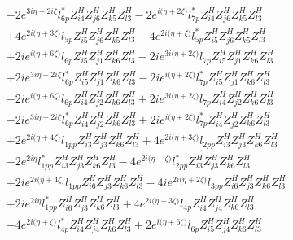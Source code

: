 \begin{align}
 &-2 e^{3 i \eta +2 i \zeta } l_{6p}^* Z_{{i 4}}^{H} Z_{{j 6}}^{H} Z_{{k 5}}^{H} Z_{{l 3}}^{H} -2 e^{i \Big(\eta +2 \zeta \Big)} l_{7p}^* Z_{{i 4}}^{H} Z_{{j 6}}^{H} Z_{{k 5}}^{H} Z_{{l 3}}^{H} \nonumber \\ 
 &+4 e^{2 i \Big(\eta +3 \zeta \Big)} l_{5p} Z_{{i 5}}^{H} Z_{{j 6}}^{H} Z_{{k 5}}^{H} Z_{{l 3}}^{H} -4 e^{2 i \Big(\eta +\zeta \Big)} l_{5p}^* Z_{{i 5}}^{H} Z_{{j 6}}^{H} Z_{{k 5}}^{H} Z_{{l 3}}^{H} \nonumber \\ 
 &+2 i e^{i \Big(\eta +6 \zeta \Big)} l_{6p} Z_{{i 5}}^{H} Z_{{j 1}}^{H} Z_{{k 6}}^{H} Z_{{l 3}}^{H} -2 i e^{3 i \Big(\eta +2 \zeta \Big)} l_{7p} Z_{{i 5}}^{H} Z_{{j 1}}^{H} Z_{{k 6}}^{H} Z_{{l 3}}^{H} \nonumber \\ 
 &+2 i e^{3 i \eta +2 i \zeta } l_{6p}^* Z_{{i 5}}^{H} Z_{{j 1}}^{H} Z_{{k 6}}^{H} Z_{{l 3}}^{H} -2 i e^{i \Big(\eta +2 \zeta \Big)} l_{7p}^* Z_{{i 5}}^{H} Z_{{j 1}}^{H} Z_{{k 6}}^{H} Z_{{l 3}}^{H} \nonumber \\ 
 &-2 i e^{i \Big(\eta +6 \zeta \Big)} l_{6p} Z_{{i 4}}^{H} Z_{{j 2}}^{H} Z_{{k 6}}^{H} Z_{{l 3}}^{H} +2 i e^{3 i \Big(\eta +2 \zeta \Big)} l_{7p} Z_{{i 4}}^{H} Z_{{j 2}}^{H} Z_{{k 6}}^{H} Z_{{l 3}}^{H} \nonumber \\ 
 &-2 i e^{3 i \eta +2 i \zeta } l_{6p}^* Z_{{i 4}}^{H} Z_{{j 2}}^{H} Z_{{k 6}}^{H} Z_{{l 3}}^{H} +2 i e^{i \Big(\eta +2 \zeta \Big)} l_{7p}^* Z_{{i 4}}^{H} Z_{{j 2}}^{H} Z_{{k 6}}^{H} Z_{{l 3}}^{H} \nonumber \\ 
 &+2 e^{2 i \Big(\eta +4 \zeta \Big)} l_{1pp} Z_{{i 3}}^{H} Z_{{j 3}}^{H} Z_{{k 6}}^{H} Z_{{l 3}}^{H} +4 e^{2 i \Big(\eta +3 \zeta \Big)} l_{2pp} Z_{{i 3}}^{H} Z_{{j 3}}^{H} Z_{{k 6}}^{H} Z_{{l 3}}^{H} \nonumber \\ 
 &-2 e^{2 i \eta } l_{1pp}^* Z_{{i 3}}^{H} Z_{{j 3}}^{H} Z_{{k 6}}^{H} Z_{{l 3}}^{H} -4 e^{2 i \Big(\eta +\zeta \Big)} l_{2pp}^* Z_{{i 3}}^{H} Z_{{j 3}}^{H} Z_{{k 6}}^{H} Z_{{l 3}}^{H} \nonumber \\ 
 &+2 i e^{2 i \Big(\eta +4 \zeta \Big)} l_{1pp} Z_{{i 6}}^{H} Z_{{j 3}}^{H} Z_{{k 6}}^{H} Z_{{l 3}}^{H} -4 i e^{2 i \Big(\eta +2 \zeta \Big)} l_{3pp} Z_{{i 6}}^{H} Z_{{j 3}}^{H} Z_{{k 6}}^{H} Z_{{l 3}}^{H} \nonumber \\ 
 &+2 i e^{2 i \eta } l_{1pp}^* Z_{{i 6}}^{H} Z_{{j 3}}^{H} Z_{{k 6}}^{H} Z_{{l 3}}^{H} +4 e^{2 i \Big(\eta +3 \zeta \Big)} l_{4p} Z_{{i 4}}^{H} Z_{{j 4}}^{H} Z_{{k 6}}^{H} Z_{{l 3}}^{H} \nonumber \\ 
 &-4 e^{2 i \Big(\eta +\zeta \Big)} l_{4p}^* Z_{{i 4}}^{H} Z_{{j 4}}^{H} Z_{{k 6}}^{H} Z_{{l 3}}^{H} +2 e^{i \Big(\eta +6 \zeta \Big)} l_{6p} Z_{{i 5}}^{H} Z_{{j 4}}^{H} Z_{{k 6}}^{H} Z_{{l 3}}^{H} \nonumber \\ 

\end{align}
